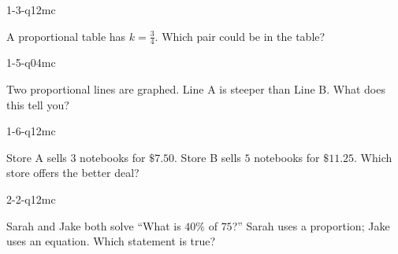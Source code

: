 
\begin{practiceQuestion}{1-3-q12}{mc}
\begin{questionText}
A proportional table has $k = \frac{3}{4}$. Which pair could be in the table?
\end{questionText}
\end{practiceQuestion}

\begin{practiceQuestion}{1-5-q04}{mc}
\begin{questionText}
Two proportional lines are graphed. Line A is steeper than Line B. What does this tell you?
\end{questionText}
\end{practiceQuestion}

\begin{practiceQuestion}{1-6-q12}{mc}
\begin{questionText}
Store A sells $3$ notebooks for $\$7.50$. Store B sells $5$ notebooks for $\$11.25$. Which store offers the better deal?
\end{questionText}
\end{practiceQuestion}

\begin{practiceQuestion}{2-2-q12}{mc}
\begin{questionText}
Sarah and Jake both solve ``What is $40\%$ of $75$?'' Sarah uses a proportion; Jake uses an equation. Which statement is true?
\end{questionText}
\end{practiceQuestion}

